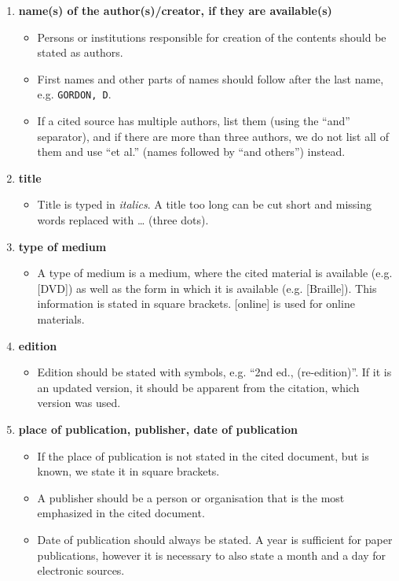 \begin{enumerate}
    \item \textbf{name(s) of the author(s)/creator, if they are available(s)}
    \begin{itemize}
        \item Persons or institutions responsible for creation of the contents should be stated as authors.
        \item First names and other parts of names should follow after the last name, e.g. \texttt{GORDON, D}.
        \item If a cited source has multiple authors, list them (using the ``and'' separator), and if there are more than three authors, we do not list all of them and use ``et al.'' (names followed by ``and others'') instead.
    \end{itemize}
    \item \textbf{title}
    \begin{itemize}
        \item Title is typed in \textit{italics}. A title too long can be cut short and missing words replaced with \ldots{} (three dots).
    \end{itemize}
    \item \textbf{type of medium}
    \begin{itemize}
        \item A type of medium is a medium, where the cited material is available (e.g. [DVD]) as well as the form in which it is available (e.g. [Braille]). This information is stated in square brackets. [online] is used for online materials.
    \end{itemize}
    \item \textbf{edition}
    \begin{itemize}
        \item Edition should be stated with symbols, e.g. ``2nd ed., (re-edition)''. If it is an updated version, it should be apparent from the citation, which version was used.
    \end{itemize}
    \item \textbf{place of publication, publisher, date of publication}
    \begin{itemize}
        \item If the place of publication is not stated in the cited document, but is known, we state it in square brackets.
        \item A publisher should be a person or organisation that is the most emphasized in the cited document.
        \item Date of publication should always be stated. A year is sufficient for paper publications, however it is necessary to also state a month and a day for electronic sources.

\end{itemize}
\end{enumerate}
